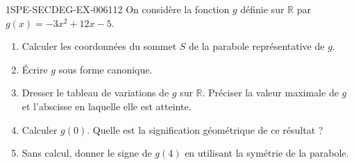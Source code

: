 \begin{exercice}{1SPE-SECDEG-EX-006}{1}{12}
On considère la fonction $g$ définie sur $\mathbb{R}$ par $g(x) = -3x^2 + 12x - 5$.

\begin{enumerate}
  \item Calculer les coordonnées du sommet $S$ de la parabole représentative de $g$.
  \item Écrire $g$ sous forme canonique.
  \item Dresser le tableau de variations de $g$ sur $\mathbb{R}$. Préciser la valeur maximale de $g$ et l'abscisse en laquelle elle est atteinte.
  \item Calculer $g(0)$. Quelle est la signification géométrique de ce résultat ?
  \item Sans calcul, donner le signe de $g(4)$ en utilisant la symétrie de la parabole.
\end{enumerate}
\end{exercice}
